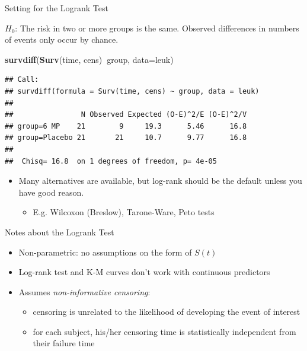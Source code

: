 \documentclass[
  ignorenonframetext,
]{beamer}
\newenvironment{Shaded}{\begin{snugshade}}{\end{snugshade}}
\newcommand{\DataTypeTok}[1]{\textcolor[rgb]{0.13,0.29,0.53}{#1}}
\newcommand{\KeywordTok}[1]{\textcolor[rgb]{0.13,0.29,0.53}{\textbf{#1}}}
\newcommand{\NormalTok}[1]{#1}
\newcommand{\OperatorTok}[1]{\textcolor[rgb]{0.81,0.36,0.00}{\textbf{#1}}}
\providecommand{\tightlist}{%
  \setlength{\itemsep}{0pt}\setlength{\parskip}{0pt}}
\begin{document}
\begin{frame}[fragile]{Setting for the Logrank Test}
\protect\hypertarget{setting-for-the-logrank-test}{}

\(H_0\): The risk in two or more groups is the same. Observed
differences in numbers of events only occur by chance.

\footnotesize

\begin{Shaded}
\begin{Highlighting}[]
\KeywordTok{survdiff}\NormalTok{(}\KeywordTok{Surv}\NormalTok{(time, cens)}\OperatorTok{~}\NormalTok{group, }\DataTypeTok{data=}\NormalTok{leuk)}
\end{Highlighting}
\end{Shaded}

\begin{verbatim}
## Call:
## survdiff(formula = Surv(time, cens) ~ group, data = leuk)
## 
##                N Observed Expected (O-E)^2/E (O-E)^2/V
## group=6 MP    21        9     19.3      5.46      16.8
## group=Placebo 21       21     10.7      9.77      16.8
## 
##  Chisq= 16.8  on 1 degrees of freedom, p= 4e-05
\end{verbatim}

\begin{itemize}
\tightlist
\item
  Many alternatives are available, but log-rank should be the default
  unless you have good reason.

  \begin{itemize}
  \tightlist
  \item
    E.g. Wilcoxon (Breslow), Tarone-Ware, Peto tests
  \end{itemize}
\end{itemize}

\end{frame}

\begin{frame}{Notes about the Logrank Test}
\protect\hypertarget{notes-about-the-logrank-test}{}

\begin{itemize}
\tightlist
\item
  Non-parametric: no assumptions on the form of \(S(t)\)
\item
  Log-rank test and K-M curves don't work with continuous predictors
\item
  Assumes \emph{non-informative censoring}:

  \begin{itemize}
  \tightlist
  \item
    censoring is unrelated to the likelihood of developing the event of
    interest
  \item
    for each subject, his/her censoring time is statistically
    independent from their failure time
  \end{itemize}
\end{itemize}

\end{frame}
\end{document}
